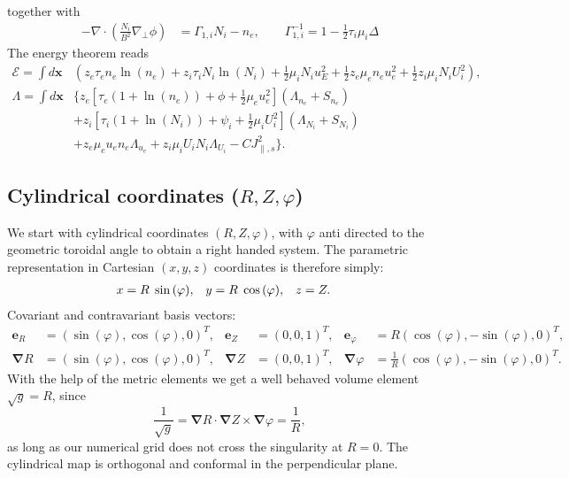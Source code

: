 \documentclass{hitec} %
\renewcommand{\vec}[1]{\boldsymbol{#1}}
\begin{document}
together with
  \begin{align}
    -\nabla\cdot\left( \frac{N_i}{B^2}\nabla_\perp \phi \right) &= \Gamma_{1,i} N_i - n_e, \quad\quad
    \Gamma_{1,i}^{-1} = 1-\frac{1}{2}\tau_i\mu_i \Delta
  \end{align}
The energy theorem reads
\begin{align}
  \mathcal{E}= \int  d\vec{x} & \left( z_e\tau_e n_e \ln{(n_e)} +z_i\tau_i N_i\ln{(N_i)}+  \frac{1}{2} \mu_i N_i u_E^2 +\frac{1}{2} z_e\mu_e  n_e u_e^2 +\frac{1}{2} z_i\mu_i  N_i U_i^2  \right),\\
  \Lambda =  \int d\vec{x} & \bigg\{  z_e\left[\tau_e\left( 1+\ln{(n_e)}\right) + \phi + \frac{1}{2} \mu_e u_e^2 \right](\Lambda_{n_e} + S_{n_e})
  \nonumber\\ &
+z_i\left[\tau_i\left( 1+\ln{(N_i)}\right) + \psi_i + \frac{1}{2} \mu_i U_i^2 \right](\Lambda_{N_i}+S_{N_i})
\nonumber \\ &
+ z_e\mu_e u_e n_e \Lambda_{u_e}+z_i\mu_iU_i N_i \Lambda_{U_i} - C J_{\parallel,s}^2\bigg\}.
\end{align}

\subsection{Cylindrical coordinates (\(R,Z,\varphi\))}\label{sec:cylmetric}
We start with cylindrical coordinates \( (R,Z,\varphi) \), with \(\varphi\) anti directed to the geometric toroidal angle to
obtain a right handed system. The parametric representation in Cartesian \((x,y,z)\) coordinates is therefore simply:
\begin{align}
 x &= R \hspace{1 mm} \sin{(\varphi)}, &
 y &= R \hspace{1 mm} \cos{(\varphi)}, &
 z &= Z .               
\end{align}
Covariant
and contravariant basis vectors:
\begin{align}
 \vec{e}_R      &= (\sin{(\varphi)} ,   \cos{(\varphi)},0)^T, &
 \vec{e}_Z      &= ( 0 ,0 ,1 )^T, &
 \vec{e}_{\varphi} &= R ( \cos{(\varphi)} , -\sin{(\varphi)} , 0 )^T,
\\
 \vec{\nabla} R &= (\sin{(\varphi)} ,   \cos{(\varphi)},0 )^T , &
  \vec{\nabla}Z &= ( 0 ,0 ,1 )^T,  &
  \vec{\nabla}{\varphi} &= \frac{1}{R} ( \cos{(\varphi)} , -\sin{(\varphi)} , 0 )^T .
\end{align}
With the help of the metric elements we get a well behaved volume element \(\sqrt{g} = R\), since 
\begin{equation}
\frac{1}{ \sqrt{g}} =  \vec{\nabla} R\cdot \vec{\nabla}Z \times\vec{\nabla}{\varphi} =\frac{1}{R},
\end{equation}
as long as our numerical grid does not cross the singularity at \(R=0\). The cylindrical map is orthogonal and conformal in the perpendicular plane. 
\end{document}
